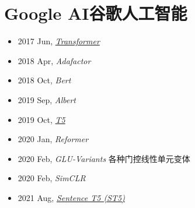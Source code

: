 \section{Google AI谷歌人工智能}\label{com:GoogleAI}

\begin{itemize}
    \item 2017 Jun, \textit{\hyperref[model:Transformer]{Transformer}}\cite{Transformer}
    \item 2018 Apr, \textit{Adafactor}\cite{Adafactor}
    \item 2018 Oct, \textit{Bert}\cite{Bert}
    \item 2019 Sep, \textit{Albert}\cite{Albert}
    \item 2019 Oct, \textit{\hyperref[model:T5]{T5}}\cite{T5}
    \item 2020 Jan, \textit{Reformer}\cite{Reformer}
    \item 2020 Feb, \textit{GLU-Variants}\cite{Glu-variants} 各种门控线性单元变体
    \item 2020 Feb, \textit{SimCLR}\cite{SimCLR}
    \item 2021 Aug, \textit{\hyperref[model:ST5]{Sentence T5 (ST5)}}\cite{Sentence-T5}
\end{itemize}